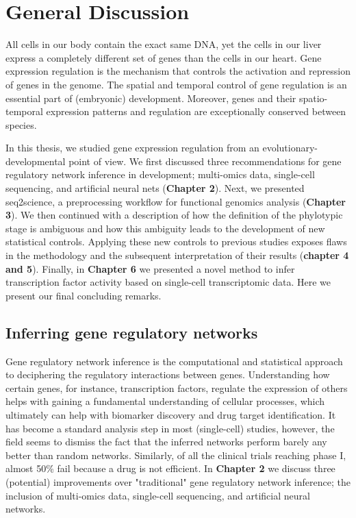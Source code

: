\chapter{General Discussion}\thumbforchapter
\newpage

All cells in our body contain the exact same DNA, yet the cells in our liver express a completely different set of genes than the cells in our heart. Gene expression regulation is the mechanism that controls the activation and repression of genes in the genome. The spatial and temporal control of gene regulation is an essential part of (embryonic) development. Moreover, genes and their spatio-temporal expression patterns and regulation are exceptionally conserved between species.

In this thesis, we studied gene expression regulation from an evolutionary-developmental point of view. We first discussed three recommendations for gene regulatory network inference in development; multi-omics data, single-cell sequencing, and artificial neural nets (\textbf{Chapter 2}). Next, we presented seq2science, a preprocessing workflow for functional genomics analysis (\textbf{Chapter 3}). We then continued with a description of how the definition of the phylotypic stage is ambiguous and how this ambiguity leads to the development of new statistical controls. Applying these new controls to previous studies exposes flaws in the methodology and the subsequent interpretation of their results (\textbf{chapter 4 and 5}). Finally, in \textbf{Chapter 6} we presented a novel method to infer transcription factor activity based on single-cell transcriptomic data. Here we present our final concluding remarks.

\section{Inferring gene regulatory networks}

Gene regulatory network inference is the computational and statistical approach to deciphering the regulatory interactions between genes. Understanding how certain genes, for instance, transcription factors, regulate the expression of others helps with gaining a fundamental understanding of cellular processes, which ultimately can help with biomarker discovery and drug target identification. It has become a standard analysis step in most (single-cell) studies, however, the field seems to dismiss the fact that the inferred networks perform barely any better than random networks\cite{McCalla_2021,Chen_2018,Pratapa_2020}. Similarly, of all the clinical trials reaching phase I, almost 50\% fail because a drug is not efficient\cite{Sun2022}. In \textbf{Chapter 2} we discuss three (potential) improvements over "traditional" gene regulatory network inference; the inclusion of multi-omics data, single-cell sequencing, and artificial neural networks.

